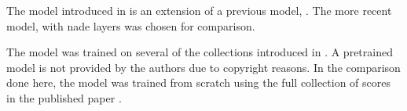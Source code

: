 
The model introduced in \textcite{micchi2021deep} is an
extension of a previous model, \textcite{micchi2020not}. The
more recent model, with \gls{nade} layers was chosen for
comparison.

The model was trained on several of the collections
introduced in . A
pretrained model is not provided by the authors due to
copyright reasons. In the comparison done here, the model
was trained from scratch using the full collection of scores
in the published paper \parencite{micchi2021deep}. 

